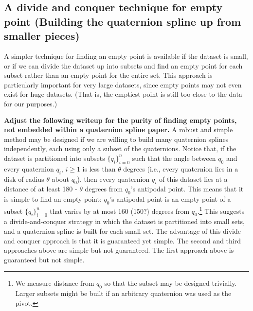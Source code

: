 \documentclass[12pt]{article}
\begin{document}

\subsection{A divide and conquer technique for empty point (Building the quaternion spline up from smaller pieces)}
\label{sec:divide}

A simpler technique for finding an empty point is available if the dataset is small,
or if we can divide the dataset up into subsets and find an empty point for each subset
rather than an empty point for the entire set.
This approach is particularly important for very large datasets,
since empty points may not even exist for huge datasets.
(That is, the emptiest point is still too close to the data for our purposes.)

{\bf Adjust the following writeup for the purity of finding empty points, not embedded within
a quaternion spline paper.}
A robust and simple method may be designed if we are willing to build many
quaternion splines independently, each using only a subset of the quaternions.
Notice that, if the dataset is partitioned into subsets $\{q_i\}_{i=0}^n$ such that
the angle between $q_0$ and every quaternion $q_i$, $i \geq 1$ is less than $\theta$
degrees (i.e., every quaternion lies in a disk of radius $\theta$ about $q_0$),
then every quaternion $q_i$ of this dataset lies at a distance of at least 180 - $\theta$
degrees from $q_0$'s antipodal point.
This means that it is simple to find an empty point:
$q_0$'s antipodal point is an empty point of a subset $\{q_i\}_{i=0}^n$ that varies
by at most 160 (150?) degrees from $q_0$.\footnote{We measure distance
  from $q_0$ so that the subset may be designed trivially.  Larger subsets
  might be built if an arbitrary quaternion was used as the pivot.}
This suggests a divide-and-conquer strategy in which the dataset is partitioned
into small sets, and a quaternion spline is built for each small set.
The advantage of this divide and conquer approach is that it is guaranteed yet simple.
The second and third approaches above are simple but not guaranteed.
The first approach above is guaranteed but not simple.
\end{document}
